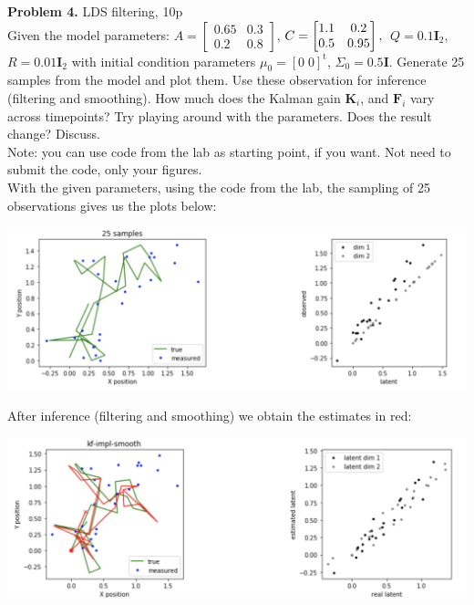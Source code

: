 \documentclass[12pt]{article}
\newcommand{\vect}[1]{\mathbf{#1}}
\begin{document}
\noindent \textbf{Problem 4.}  LDS filtering, 10p\\ 
Given the model parameters: $A = 
\begin{bmatrix} %
0.65 &   0.3\\
    0.2   & 0.8
\end{bmatrix}
$,
$C= 
\begin{bmatrix}  
    1.1 & 0.2\\
    0.5 & 0.95\\
\end{bmatrix},\\
$
$Q= 0.1 \vect{I}_2$, 
$R= 0.01 \vect{I}_2$ with initial condition parameters $\mu_0 = [0\; 0]^\mathrm{t}$, $\Sigma_0 = 0.5 \vect{I}$.
Generate 25 samples from the model and  plot them. Use these observation for inference (filtering and smoothing). How much does the Kalman gain $\mathbf{K}_i$, and $\mathbf{F}_i$ vary across timepoints? Try playing around with the parameters. Does the result change? Discuss.\\
Note: you can use code from the lab as starting point, if you want. Not need to submit the code, only your figures.
\\

With the given parameters, using the code from the lab, the sampling of 25 observations gives us the plots below:
\begin{center}
	\includegraphics[width=1\linewidth]{figures/problem_4_1.png} 
\end{center}

After inference (filtering and smoothing) we obtain the estimates in red:
\begin{center}
	\includegraphics[width=1\linewidth]{figures/problem_4_2.png} 
\end{center}
\end{document}
